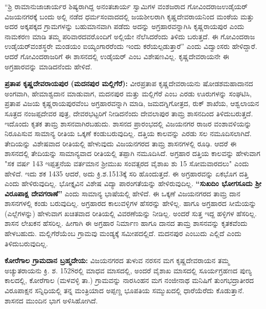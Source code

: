 “ಶ್ರಿ ರಾಮಾನುಜಾಚಾರ್ಯರ ಶಿಷ್ಯರಾಗಿದ್ದ ಅನಂತಚಾರ್ಯ ಸ್ವಾಮಿಗಳ ವಂಶಜರಾದ ಗೋವಿಂದರಾಜ\break ಉಡೈಯರ್​ ವಿಜಯನಗರಕ್ಕೆ ಬಂದು ಅಲ್ಲಿ ನಡೆದ ಧರ್ಮಸಂವಾದದಲ್ಲಿ ಜಯಶೀಲರಾಗಿ ಕೃಷ್ಣದೇವರಾಯನಿಂದ ಮಂಠೆಯ ಮತ್ತು ಅದರ ಅಕ್ಕಪಕ್ಕದ ಗ್ರಾಮಗಳನ್ನು ಬಹುಮಾನವಾಗಿ ಪಡೆದು ಅದನ್ನು ಅಗ್ರಹಾರವನ್ನಾಗಿಸಿ ಕೃಷ್ಣರಾಯಪುರ ಎಂದು ನಾಮಕರಣ ಮಾಡಿ ತಮ್ಮ ಪರಿವಾರದವರೊಂದಿಗೆ ಅಲ್ಲಿಯೇ ನೆಲೆಸಿದರೆಂದು ತಿಳಿದು ಬರುತ್ತದೆ. ಈ ಗೋವಿಂದರಾಜ ಉಡೈಯರ್​ ವಂಶಸ್ಥರೇ ಮಂಡಯಂ ಐಯ್ಯಂಗಾರರೆಂದು ಇಂದು ಕರೆಯಲ್ಪಡುತ್ತಾರೆ” ಎಂದು ವಿದ್ವಾಂಸರು ಹೇಳಿದ್ದಾರೆ. ಆದರೆ ಗೋವಿಂದರಾಜರಿಗೆ ಈ ಶಾಸನದಲ್ಲಿ ಉಡೈಯರ್​ ಎಂಬ ವಿಶೇಷಣವಿಲ್ಲ. ಕೃಷ್ಣದೇವರಾಯನೇ ಈ ಅಗ್ರಹಾರವನ್ನು ಮಾಡಿದನೆಂದು ಹೇಳಿದೆ.

\textbf{ಪ್ರತಾಪ ಕೃಷ್ಣದೇವರಾಯಪುರ (ಮದನಪುರ ಮಲ್ಲಿಗೆರೆ):} ವೀರಪ್ರತಾಪ ಕೃಷ್ಣದೇವರಾಯನು ಷೋಡಶ\break ಮಹಾದಾನದ ಅಂಗವಾಗಿ, ಹೇಮಾಶ್ವದಾನ ಮಾಡುವಾಗ, ಮದನಪುರ ಮತ್ತು ಮಲ್ಲಿಗೆರೆ ಎಂಬ ಎರಡು ಊರುಗಳನ್ನು ಸಂಘಟಿಸಿ, ಪ್ರತಾಪ ವಿಜಯ ಕೃಷ್ಣರಾಯಪುರವೆಂಬ ಅಗ್ರಹಾರವನ್ನಾಗಿ ಮಾಡಿ, ಜಮದಗ್ನಿಗೋತ್ರದ, ರುಕ್​ ಶಾಖೆಯ, ಆಶ್ವಲಾಯನ ಸೂತ್ರದ ನಂಜಪ್ಪದೇವರ ಪುತ್ರ, ದೇವರಭಟ್ಟರಿಗೆ ನೀಡಿದನೆಂದು ದೇವಲಾಪುರ ತಾಮ್ರ ಶಾಸನದಿಂದ ತಿಳಿದು\-ಬರುತ್ತದೆ. ಇದೊಂದು ಕೃತಕ ತಾಮ್ರ ಶಾಸನವಾಗಿರಬಹುದು. ಶಾಸನದ ಪ್ರಾರಂಭದಲ್ಲಿ ವಿಜಯನಗರ ರಾಜರ ವಂಶಾವಳಿಯನ್ನು ನಿರೂಪಿಸುವ ಸಾಮಾನ್ಯ ರೀತಿಯ ಒಕ್ಕಣೆ ಕಂಡುಬರುವುದಿಲ್ಲ. ದತ್ತಿಯ ಕಾಲವನ್ನು ಎರಡು ಸಲ ನಮೂದಿಸಲಾಗಿದೆ. ತೇದಿಯನ್ನು ವಿಶೇಷವಾದ ರೀತಿಯಲ್ಲಿ ಹೇಳುವುದು ವಿಜಯನಗರದ ತಾಮ್ರ ಶಾಸನಗಳಲ್ಲಿ ರೂಢಿ. ಆದರೆ ಈ ಶಾಸನದಲ್ಲಿ ತೇದಿಯನ್ನು ಸಾಮಾನ್ಯವಾದ ರೀತಿಯಲ್ಲಿ ತಪ್ಪಾಗಿ ನಮೂದಿಸಿದೆ. ಅಗ್ರಹಾರ ದತ್ತಿಯ ಕಾಲವನ್ನು ಹೇಳುವಾಗ "ಸಕ ವರ್ಷ 143 ಇಪ್ಪತ್ತನೆಯ ವರ್ತಮಾನ ಶ‍್ರೀಮುಖ ಸಂವತ್ಸರದ ವೈಶಾಖ ಶು 15 ಸೋಮವಾರದಲು" ಎಂದು ಹೇಳಿದೆ. ಇದು ಶಕ 1435 ಆದರೆ, ಅದು ಕ್ರಿ.ಶ.1513ಕ್ಕೆ ಸರಿ ಹೊಂದುತ್ತದೆ. ಈ ಅಗ್ರಹಾರವನ್ನು ಏಕಭೊಗ ದತ್ತಿ ಎಂದು ಹೇಳಿರುವುದಿಲ್ಲ. ಭೋಕ್ತೃವಿನ ವಿಶೇಷ ವಿದ್ಯಾ ಪಾರಂಗತೆಯನ್ನು ಹೇಳಿರುವುದಿಲ್ಲ. \textbf{“ಸುಖದಿಂ ಭೋಗಸೂದು ಶ‍್ರೀ ವಿರೂಪಾಕ್ಷ ದೇವಗರಾಣೆ”} ಎಂದು ಸಾಮಾನ್ಯ ಭಾಷೆಯಲ್ಲಿ ಹೇಳಿದೆ. ಈ ಒಕ್ಕಣೆ ವಿಜಯನಗರದ ತಾಮ್ರ ದಾನ ಶಾಸನಗಳಲ್ಲಿ ಕಂಡು ಬರುವುದಿಲ್ಲ. ಅಗ್ರಹಾರದ ಕಾಲುವಳ್ಳಿಗಳ ಹೆಸರನ್ನು ಹೇಳಿಲ್ಲ. ಹಾಗೂ ಅಗ್ರಹಾರದ ಸೀಮೆಯನ್ನು (ಎಲ್ಲೆಗಳನ್ನು) ಹೇಳುವಾಗ ಖಚಿತವಾದ ರೀತಿಯಲ್ಲಿ ವಿವರಣೆಯನ್ನು ನೀಡಿಲ್ಲ. ಅಂದರೆ ಸುತ್ತ ಇದ್ದ ಹಳ್ಳಿಗಳ ಹೆಸರಿಲ್ಲ. ಶಾಸನ ಲೇಖಕನ ಹೆಸರಿಲ್ಲ. ಹೀಗಾಗಿ ಈ ಅಗ್ರಹಾರ ನಿರ್ಮಾಣ ಹಾಗೂ ದಾನದ ತಾಮ್ರ ಶಾಸನವನ್ನು ಕೃತಕವೆಂದು ಹೇಳಬಹುದು. ಮಲ್ಲಿಗೆರೆಯೆಂಬ ಗ್ರಾಮವು ಮಂಡ್ಯಕ್ಕೆ ಸಮೀಪದಲ್ಲಿದೆ. ಮದನಪುರ ಎಂಬುದು ಎಲ್ಲಿದೆ ಎಂದು ತಿಳಿದುಬರುವುದಿಲ್ಲ.

\textbf{ಕೋರೆಗಾಲ ಗ್ರಾಮದಾನ \enginline{-} ಬ್ರಹ್ಮದೇಯ:} ವಿಜಯನಗರದ ತುಳುವ ನರಸನ ಮಗ ಕೃಷ್ಣದೇವರಾಯನ ತಮ್ಮ ಅಚ್ಯುತರಾಯನು ಕ್ರಿ. ಶ. 1528ರಲ್ಲಿ ಮಾಧವ ಮಾಸದಲ್ಲಿ, ಅಂದರೆ ವೈಶಾಖ ಮಾಸದಲ್ಲಿ ಸೂರ್ಯಗ್ರಹಣದ ಪುಣ್ಯ ಕಾಲದಲ್ಲಿ, ಕೋರೆಗಾಲ (ಮಳವಳ್ಳಿ ತಾ.) ಗ್ರಾಮವನ್ನು ನಾರಸಿಂಹನ ಮಗ ನಂಜೀನಾಥ ಮನಿಷಿಗೆ ತುಂಗಭದ್ರಾತೀರದ ವಿರೂಪಾಕ್ಷನ ಸನ್ನಿಧಿಯಲ್ಲಿ ತನ್ನ ಮಂತ್ರಿಯಾದ ಅಪ್ಪಣ್ಣ ಭೂಪತಿಯ ಸಮ್ಮುಖದಲ್ಲಿ ಧಾರೆಯೆರೆದು ಕೊಡುತ್ತಾನೆ. ಶಾಸನದ ಮುಂದಿನ ಭಾಗ ಅಳಿಸಿಹೋಗಿದೆ.

